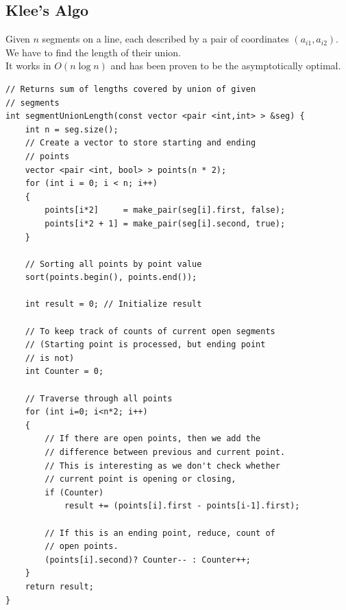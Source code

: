 \documentclass[8pt, a4paper, oneside, twocolumn]{extarticle}
\begin{document}
\subsection{Klee's Algo}
Given $n$ segments on a line, each described by a pair of coordinates $(a_{i1}, a_{i2})$. We have to find the length of their union.
\\It works in $O(n\log n)$ and has been proven to be the asymptotically optimal.
\begin{verbatim}
// Returns sum of lengths covered by union of given 
// segments 
int segmentUnionLength(const vector <pair <int,int> > &seg) {
    int n = seg.size(); 
    // Create a vector to store starting and ending 
    // points 
    vector <pair <int, bool> > points(n * 2); 
    for (int i = 0; i < n; i++) 
    { 
        points[i*2]     = make_pair(seg[i].first, false); 
        points[i*2 + 1] = make_pair(seg[i].second, true); 
    } 
  
    // Sorting all points by point value 
    sort(points.begin(), points.end()); 
  
    int result = 0; // Initialize result 
  
    // To keep track of counts of current open segments 
    // (Starting point is processed, but ending point 
    // is not) 
    int Counter = 0; 
  
    // Traverse through all points 
    for (int i=0; i<n*2; i++) 
    { 
        // If there are open points, then we add the 
        // difference between previous and current point. 
        // This is interesting as we don't check whether 
        // current point is opening or closing, 
        if (Counter) 
            result += (points[i].first - points[i-1].first); 
  
        // If this is an ending point, reduce, count of 
        // open points. 
        (points[i].second)? Counter-- : Counter++; 
    } 
    return result; 
} 
\end{verbatim}
\end{document}
